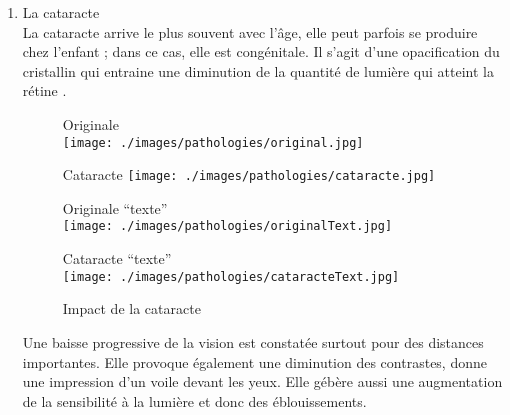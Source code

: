 \documentclass[french,a4paper]{report}
\begin{document}
{\begin{enumerate}
\begin{figure}[H]
\begin{minipage}{0.5\textwidth}
\texttt{[image: ./images/pathologies/DMLAevolueText.jpg]}
\end{minipage}
\caption{Impact de la DMLA}
\end{figure}
Elle induit une déformation de la vision centrale (ondulation) ainsi que des troubles dans la perception des contrastes et des couleurs.
\newline
\item La cataracte
\\La cataracte arrive le plus souvent avec l'âge, elle peut parfois se produire chez l'enfant ; dans ce cas, elle est congénitale. Il s'agit d'une opacification du cristallin qui entraine une diminution de la quantité de lumière qui atteint la rétine \cite{descpatcataracte}.\\
\begin{figure}[H]
\begin{minipage}{0.5\textwidth}
\centering
Originale \\ \vspace{0.2cm}
\texttt{[image: ./images/pathologies/original.jpg]}
\end{minipage}
\begin{minipage}{0.5\textwidth}
\centering
Cataracte\vspace{0.2cm}
\texttt{[image: ./images/pathologies/cataracte.jpg]}
\end{minipage}
\begin{minipage}{0.5\textwidth}
\centering
\vspace{0.4cm}Originale \enquote{texte}\\ \vspace{0.1cm}
\texttt{[image: ./images/pathologies/originalText.jpg]}
\end{minipage}
\begin{minipage}{0.5\textwidth}
\centering
\vspace{0.4cm}Cataracte \enquote{texte}\\ \vspace{0.1cm}
\texttt{[image: ./images/pathologies/cataracteText.jpg]}
\end{minipage}
\caption{Impact de la cataracte}
\end{figure}
Une baisse progressive de la vision est constatée surtout pour des distances importantes. Elle provoque également une diminution des contrastes, donne une impression d'un voile devant les yeux. Elle gébère aussi une augmentation de la sensibilité à la lumière et donc des éblouissements.
\newline

\end{enumerate}}
\end{document}
